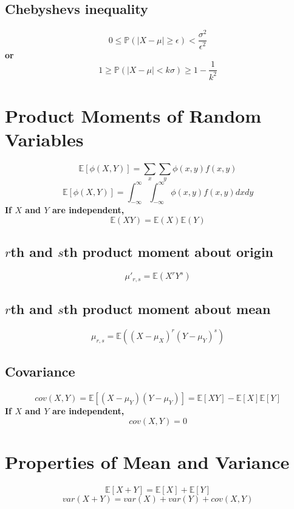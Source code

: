 \documentclass[titlepage]{article}
\begin{document}
        \subsection{Chebyshevs inequality}
            \paragraph{
                $$0\leq\mathbb{P}(|X-\mu|\geq \epsilon)<\frac{\sigma^2}{\epsilon^2}$$
                or
                $$1\geq \mathbb{P}(|X-\mu|<k\sigma)\geq1-\frac{1}{k^2}$$
            }
    \section{Product Moments of Random Variables}
        \paragraph{
            $$\mathbb{E}[\phi(X,Y)]=\sum_x \sum_y \phi(x,y)f(x,y)$$
            $$\mathbb{E}[\phi(X,Y)]=\int_{-\infty}^\infty \int_{-\infty}^\infty \phi(x,y)f(x,y)dxdy$$
            If $X$ and $Y$ are independent,
            $$\mathbb{E}(XY)=\mathbb{E}(X)\mathbb{E}(Y)$$
        }
        \subsection{$r$th and $s$th product moment about origin}
            $$\mu'_{r,s}=\mathbb{E}(X^rY^s)$$
        \subsection{$r$th and $s$th product moment about mean}
            $$\mu_{r,s}=\mathbb{E}((X-\mu_X)^r(Y-\mu_Y)^s)$$
        \subsection{Covariance}
            \paragraph{
                $$cov(X,Y)=\mathbb{E}[(X-\mu_Y)(Y-\mu_Y)]=\mathbb{E}[XY]-\mathbb{E}[X]\mathbb{E}[Y]$$
                If $X$ and $Y$ are independent,
                $$cov(X,Y)=0$$
            }
    \section{Properties of Mean and Variance}
        \paragraph{
            $$\mathbb{E}[X+Y]=\mathbb{E}[X]+\mathbb{E}[Y]$$
            $$var(X+Y)=var(X)+var(Y)+cov(X,Y)$$
        }
\end{document}
